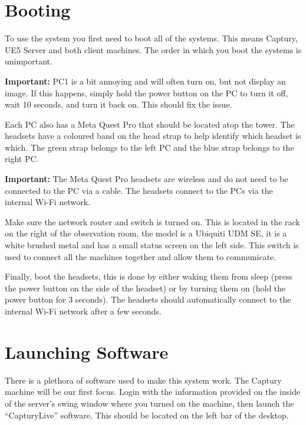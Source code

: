 \section{Booting}
To use the system you first need to boot all of the systems. This means Captury, UE5 Server and both client machines. The order in which you boot the systems is unimportant.

\begin{tcolorbox}
    \textbf{Important:} PC1 is a bit annoying and will often turn on, but not display an image. If this happens, simply hold the power button on the PC to turn it off, wait 10 seconds, and turn it back on. This should fix the issue.
\end{tcolorbox}

Each PC also has a Meta Quest Pro that should be located atop the tower. The headsets have a coloured band on the head strap to help identify which headset is which. The green strap belongs to the left PC and the blue strap belongs to the right PC.

\begin{tcolorbox}
    \textbf{Important:} The Meta Quest Pro headsets are wireless and do not need to be connected to the PC via a cable. The headsets connect to the PCs via the internal Wi-Fi network.
\end{tcolorbox}

Make sure the network router and switch is turned on. This is located in the rack on the right of the observation room, the model is a Ubiquiti UDM SE, it is a white brushed metal and has a small status screen on the left side. This switch is used to connect all the machines together and allow them to communicate.

Finally, boot the headsets, this is done by either waking them from sleep (press the power button on the side of the headset) or by turning them on (hold the power button for 3 seconds). The headsets should automatically connect to the internal Wi-Fi network after a few seconds.

\section{Launching Software}
There is a plethora of software used to make this system work. The Captury machine will be our first focus. Login with the information provided on the inside of the server's swing window where you turned on the machine, then launch the ``CapturyLive'' software. This should be located on the left bar of the desktop.

